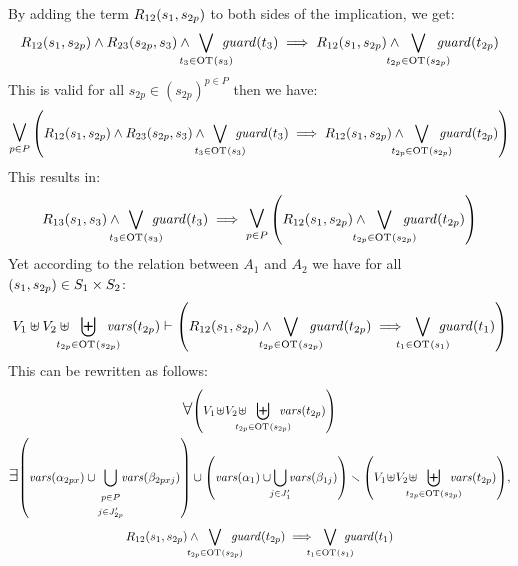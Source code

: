\documentclass[runningheads]{llncs}
\begin{document}
\begin{enumerate}
By adding the term $R_{12}{\left(s_1,s_{2p}\right)}$ to both sides of the implication, we get:
\begin{align*}
R_{12}\mpar{s_1,s_{2p}}\wedge R_{23}\mpar{s_{2p}, s_3} \wedge \bigvee_\subbox{t_3 \in \fOT{s_3}} \fguard{t_3} \implies R_{12}\mpar{s_1,s_{2p}}\wedge \bigvee_\subbox{t_{2p} \in \fOT{s_{2p}}} \fguard{t_{2p}} 
\end{align*}
This is valid for all $s_{2p} \in (s_{2p})^{p\in P}$ then we have:
\begin{align*}
\operatorname*{\bigsymb{\bigvee}}_{p\in P}\mpar{
R_{12}\mpar{s_1,s_{2p}}\wedge R_{23}\mpar{s_{2p}, s_3} \wedge \bigvee_\subbox{t_3 \in \fOT{s_3}} \fguard{t_3} \implies R_{12}\mpar{s_1,s_{2p}}\wedge \bigvee_\subbox{t_{2p} \in \fOT{s_{2p}}} \fguard{t_{2p}}} 
\end{align*}
This results in:
\begin{align*}
R_{13}\mpar{s_1,s_3} \wedge \bigvee_\subbox{t_3 \in \fOT{s_3}} \fguard{t_3} \implies \operatorname*{\bigsymb{\bigvee}}_{p\in P}\mpar{ R_{12}\mpar{s_1,s_{2p}}\wedge \bigvee_\subbox{t_{2p} \in \fOT{s_{2p}}} \fguard{t_{2p}}} 
\end{align*}
Yet according to the relation between $A_1$ and $A_2$ we have  for all ${\left(s_1, s_{2p}\right)} \in S_1 \times S_2$:
\begin{multline*}
 V_1 \uplus V_2 \uplus \biguplus_\subbox{t_{2p} \in \fOT{s_{2p}}} \fvars{t_{2p}} \vdash \left(R_{12}\mpar{s_1, s_{2p}} \wedge \bigvee_\subbox{t_{2p} \in \fOT{s_{2p}}} \fguard{t_{2p}} \implies \bigvee_\subbox{t_1 \in \fOT{s_1}} \fguard{t_1} \right)
\end{multline*}
This can be rewritten as follows: 
\begin{multline*}
\everymath{\displaystyle}
\bigforall \mpar{V_1\! \uplus\! V_2\! \uplus  \biguplus_\subbox{t_{2p} \in \fOT{s_{2p}}} \fvars{t_{2p}}}\\
\bigexists \mpar{\fvars{\alpha_{2px}}  \cup  \bigcup_{\begin{array}{c} \subbox{p\in P}\\ \subbox{j \in J'_{2p}}
\end{array}} \!\! \fvars{\beta_{2pxj}}}\cup \mpar{\fvars{\alpha_{1}}  \cup\!\! \bigcup_{j \in J'_{1}} \!\!\fvars{\beta_{1j}}}
 \setminus \mpar{V_1\! \uplus\! V_2\! \uplus \biguplus_\subbox{t_{2p} \in \fOT{s_{2p}}} \fvars{t_{2p}}},\\
R_{12}\mpar{s_1, s_{2p}} \wedge \bigvee_\subbox{t_{2p} \in \fOT{s_{2p}}} \fguard{t_{2p}} \implies \bigvee_\subbox{t_1 \in \fOT{s_1}} \fguard{t_1}
\end{multline*}

\end{enumerate}
\end{document}
